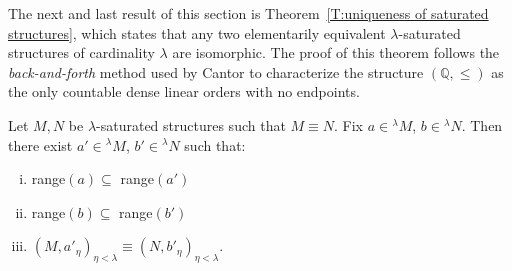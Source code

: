\documentclass{scrartcl}
\begin{document}
The next and last result of this section is Theorem~\ref{T:uniqueness of saturated structures}, which states that any two elementarily equivalent $\lambda$-saturated structures of cardinality $\lambda$ are isomorphic.
The proof of this theorem follows the \emph{back-and-forth} method used by Cantor to characterize the structure $(\mathbb{Q},\le)$ as the only countable dense linear orders with no endpoints.




\begin{lemma}
\label{L:back and forth for saturation}

Let $M,N$ be $\lambda$-saturated structures such that $M \equiv N$. Fix $a\in{}^\lambda M$, $b\in{}^\lambda N$. Then there exist  $a'\in{}^\lambda M$, $b'\in{}^\lambda N$ such that:
\begin{enumerate}[(i)]

\item range$(a)\subseteq$ range$(a')$
\item range$(b)\subseteq$ range$(b')$
\item $(M,a'_\eta)_{\eta<\lambda} \equiv (N,b'_\eta)_{\eta<\lambda}$.

\end{enumerate}
\end{lemma}
\end{document}
